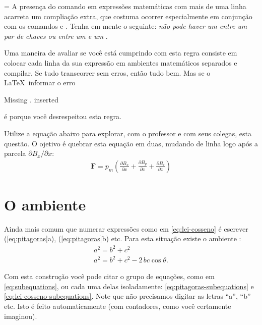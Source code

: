 \documentclass[a4paper,12pt]{amsart}
\newcommand{\vetor}[1]{\ensuremath{\mathbf{#1}}}
\newlength\atencaowidth
\newenvironment{atencao}{%
		\medskip%
		\noindent\hangindent=\atencaowidth\hangafter=-2%
		\hspace{-\atencaowidth}%
		\usebox{\atencaobox}\footnotesize
		\setlength\parindent\atencaowidth}{\par\medskip}
\begin{document}
	\begin{atencao}%
	A presença do comando \cs{\textbackslash} em expressões matemáticas com mais de uma linha acarreta um compliação extra, que costuma ocorrer especialmente em conjunção com os comandos  e . Tenha em mente o seguinte: \emph{não pode haver um \cs{\textbackslash} entre um par de chaves ou entre um  e um }.
	
	Uma maneira de avaliar se você está cumprindo com esta regra consiste em colocar cada linha da sua expressão em ambientes matemáticos separados e compilar. Se tudo transcorrer sem erros, então tudo bem. Mas se o \LaTeX\ informar o erro	
	\begin{center}\ttfamily
		Missing . inserted
	\end{center}
	é porque você desrespeitou esta regra.	
	
	Utilize a equação abaixo para explorar, com o professor e com seus colegas, esta questão. O ojetivo é quebrar esta equação em duas, mudando de linha logo após a parcela $\partial B_x/\partial x$:
	\begin{gather*}
		\vetor F = p_m \left( \frac{\partial B_x}{\partial x} + \frac{\partial B_y}{\partial x} + \frac{\partial B_z}{\partial x}\right)
	\end{gather*}
	
	\end{atencao}
	
	\section{O ambiente }
	
	Ainda mais comum que numerar expressões como em \eqref{eq:lei-cosseno} é escrever (\ref{eq:pitagoras}a), (\ref{eq:pitagoras}b) etc. Para esta situação existe o ambiente :
	\begin{subequations}\label{eq:subequations}
		\begin{gather}
			a^2 = b^2 + c^2 \label{eq:pitagoras-subequations}\\
			a^2 = b^2 + c^2 - 2\, b c \cos\theta\text{.} \label{eq:lei-cosseno-subequations}
		\end{gather}
	\end{subequations}
	
	Com esta construção você pode citar o grupo de equações, como em \eqref{eq:subequations}, ou cada uma delas isoladamente: \eqref{eq:pitagoras-subequations} e \eqref{eq:lei-cosseno-subequations}. Note que não precisamos digitar as letras ``a'', ``b'' etc. Isto é feito automaticamente (com contadores, como você certamente imaginou).
	
\end{document}
